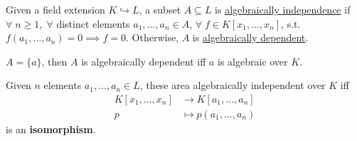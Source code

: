 \begin{definition}
	Given a field extension \( K \hookrightarrow L \), a subset \( A \subseteq L \) is
	\underline{algebraically independence} if \( \forall \; n \geq 1, \; \forall \) distinct elements \(
	a_1,\ldots, a_n \in A \), \( \forall \; f\in K[x_1,\ldots, x_n] \), s.t. \( f(a_1,\ldots, a_n) = 0
	\implies  f= 0\). Otherwise, \( A \) is \underline{algebraically dependent}.
\end{definition}

\begin{eg}
	\( A = \{a\} \), then \( A \) is algebraically dependent iff \( a \) is algebraic over \( K \).
\end{eg}

\begin{remark}
	Given \( n \) elements \( a_1,\ldots, a_n \in L \), these area algebraically independent over \( K \) iff
	\[
		\begin{aligned}
			K[x_1,\ldots, x_n] & \to K[a_1,\ldots, a_n]     \\
			p                  & \mapsto p(a_1,\ldots, a_n)
		\end{aligned}
	\]
	is an \textbf{isomorphism}.
\end{remark}

